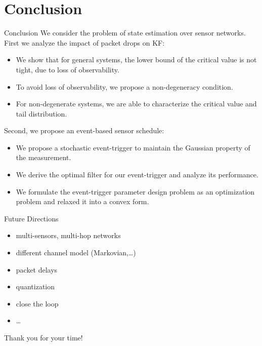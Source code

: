 \documentclass{beamer}
\begin{document}
  \section{Conclusion}
  \begin{frame}{Conclusion}
    We consider the problem of state estimation over sensor networks. First we analyze the impact of packet drops on KF:
    \begin{itemize}
      \item We show that for general systems, the lower bound of the critical value is not tight, due to loss of observability.
      \item To avoid loss of observability, we propose a non-degeneracy condition.
      \item For non-degenerate systems, we are able to characterize the critical value and tail distribution.
    \end{itemize}
    Second, we propose an event-based sensor schedule:
    \begin{itemize}
      \item We propose a stochastic event-trigger to maintain the Gaussian property of the measurement.
      \item We derive the optimal filter for our event-trigger and analyze its performance.
      \item We formulate the event-trigger parameter design problem as an optimization problem and relaxed it into a convex form.
    \end{itemize}
  \end{frame}
  \begin{frame}{Future Directions}
    \begin{itemize}
      \item multi-sensors, multi-hop networks
      \item different channel model (Markovian,\dots) 
      \item packet delays
      \item quantization 
      \item close the loop
      \item \dots
    \end{itemize}
  \end{frame}
  \begin{frame}
    \center\Huge{Thank you for your time!}
  \end{frame}
  
\end{document}
